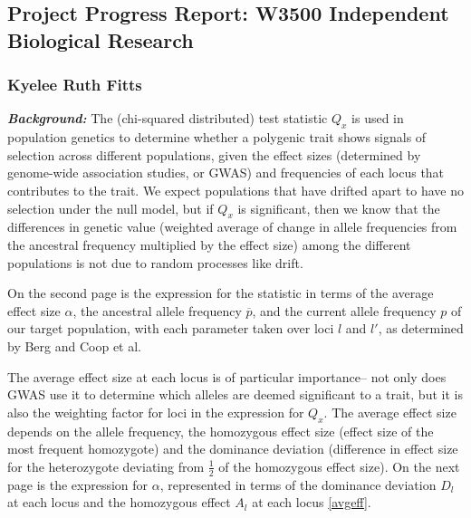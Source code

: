 \documentclass[a4paper,11pt]{article}
\begin{document}
\subsection*{Project Progress Report: W3500 Independent Biological Research}
\subsubsection*{Kyelee Ruth Fitts}

\textbf{\emph{Background:}} The (chi-squared distributed) test statistic $Q_x$ is used in
population genetics to determine whether a polygenic trait shows
signals of selection across different populations, given the effect
sizes (determined by genome-wide association studies, or GWAS) and frequencies of each locus that
contributes to the trait. We expect populations that have drifted
apart to have no selection under the null model, but if $Q_x$ is
significant, then we know that the differences in genetic value (weighted average of
change in allele frequencies from the ancestral frequency multiplied by the
effect size) among the different populations is not due to random processes like drift. 

On the second page is the expression for the statistic in terms of the average
effect size $\alpha$, the ancestral allele frequency
$\overline{p}$, and the current allele frequency $p$ of our target
population, with each parameter taken over loci $l$ and $l'$, as
determined by Berg and Coop et al. \cite{gwasintro}

The average effect size at each locus is of particular
importance-- not only does GWAS use it to determine which alleles are deemed
significant to a trait, but it is also the weighting factor for loci in the
expression for $Q_x$. The average effect size depends on the allele
frequency, the homozygous effect size (effect size of the most frequent homozygote) and the
dominance deviation (difference in effect size for the heterozygote
deviating from $\frac{1}{2}$ of the homozygous effect size). On the
next page is the expression for $\alpha$,
represented in terms of the dominance deviation $D_l$ at each locus and
the homozygous effect $A_l$ at each locus \eqref{avgeff}.
\end{document}
